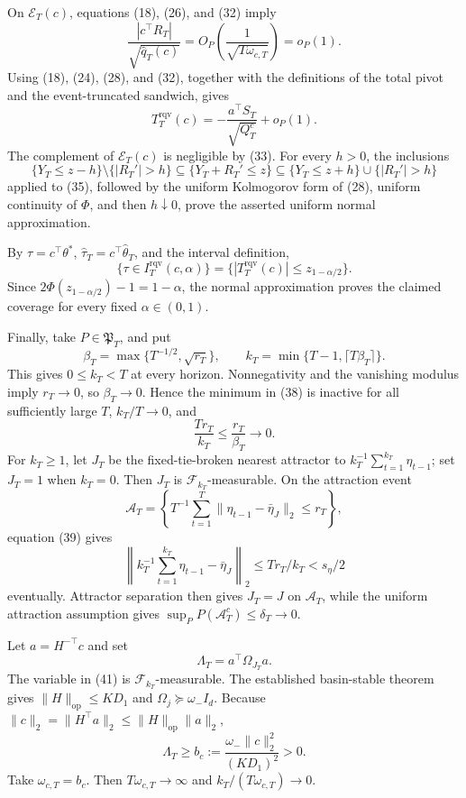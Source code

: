 On \(\mathcal E_T(c)\), equations (18), (26), and (32) imply
\[
 \frac{|c^\top R_T|}{\sqrt{\widehat q_T(c)}}
 =O_P\!\left(\frac1{\sqrt{T\omega_{c,T}}}\right)=o_P(1).
\tag{34}
\]
Using (18), (24), (28), and (32), together with the definitions of the total
pivot and the event-truncated sandwich, gives
\[
 T_T^{\mathrm{rqv}}(c)
 =-\frac{a^\top S_T}{\sqrt{Q_T^c}}+o_P(1).
\tag{35}
\]
The complement of \(\mathcal E_T(c)\) is negligible by (33).  For every
\(h>0\), the inclusions
\[
 \{Y_T\le z-h\}\setminus\{|R_T'|>h\}
 \subseteq\{Y_T+R_T'\le z\}
 \subseteq\{Y_T\le z+h\}\cup\{|R_T'|>h\}
\tag{36}
\]
applied to (35), followed by the uniform Kolmogorov form of (28), uniform
continuity of \(\Phi\), and then \(h\downarrow0\), prove the asserted uniform
normal approximation.

By \(\tau=c^\top\theta^*\), \(\widehat\tau_T=c^\top\widehat\theta_T\), and
the interval definition,
\[
 \{\tau\in I_T^{\mathrm{rqv}}(c,\alpha)\}
 =\{|T_T^{\mathrm{rqv}}(c)|\le z_{1-\alpha/2}\}.
\tag{37}
\]
Since \(2\Phi(z_{1-\alpha/2})-1=1-\alpha\), the normal approximation proves
the claimed coverage for every fixed \(\alpha\in(0,1)\).

Finally, take \(P\in\mathfrak P_T\), and put
\[
 \beta_T=\max\{T^{-1/2},\sqrt{r_T}\},\qquad
 k_T=\min\{T-1,\lceil T\beta_T\rceil\}.
\tag{38}
\]
This gives \(0\le k_T<T\) at every horizon.  Nonnegativity and the vanishing
modulus imply \(r_T\to0\), so \(\beta_T\to0\).  Hence the minimum in (38) is
inactive for all sufficiently large \(T\), \(k_T/T\to0\), and
\[
 \frac{Tr_T}{k_T}\le\frac{r_T}{\beta_T}\longrightarrow0.
\tag{39}
\]
For \(k_T\ge1\), let \(J_T\) be the fixed-tie-broken nearest attractor to
\(k_T^{-1}\sum_{t=1}^{k_T}\eta_{t-1}\); set \(J_T=1\) when \(k_T=0\).
Then \(J_T\) is \(\mathcal F_{k_T}\)-measurable.  On the attraction event
\[
 \mathcal A_T=
 \left\{T^{-1}\sum_{t=1}^T
 \|\eta_{t-1}-\bar\eta_J\|_2\le r_T\right\},
\]
equation (39) gives
\[
 \left\|k_T^{-1}\sum_{t=1}^{k_T}\eta_{t-1}-\bar\eta_J\right\|_2
 \le Tr_T/k_T<s_\eta/2
\tag{40}
\]
eventually.  Attractor separation then gives \(J_T=J\) on \(\mathcal A_T\),
while the uniform attraction assumption gives
\(\sup_PP(\mathcal A_T^c)\le\delta_T\to0\).

Let \(a=H^{-\top}c\) and set
\[
 \Lambda_T=a^\top\Omega_{J_T}a.
\tag{41}
\]
The variable in (41) is \(\mathcal F_{k_T}\)-measurable.  The established
basin-stable theorem gives \(\|H\|_{\mathrm{op}}\le KD_1\) and
\(\Omega_j\succeq\omega_-I_d\).  Because
\(\|c\|_2=\|H^\top a\|_2\le\|H\|_{\mathrm{op}}\|a\|_2\),
\[
 \Lambda_T\ge b_c:=\frac{\omega_-\|c\|_2^2}{(KD_1)^2}>0.
\tag{42}
\]
Take \(\omega_{c,T}=b_c\).  Then \(T\omega_{c,T}\to\infty\) and
\(k_T/(T\omega_{c,T})\to0\).

